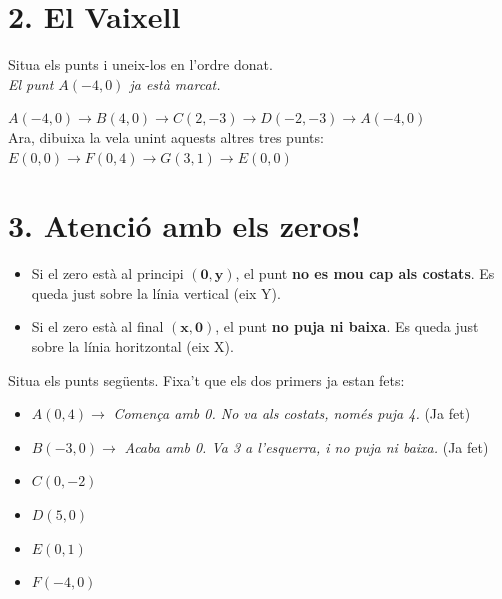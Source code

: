 \documentclass[12pt,a4paper]{article}
\begin{document}
\newpage
\section*{2. El Vaixell}
Situa els punts i uneix-los en l'ordre donat. \\
\textit{El punt $A(-4, 0)$ ja està marcat.}

$A(-4, 0) \to B(4, 0) \to C(2, -3) \to D(-2, -3) \to A(-4, 0)$ \\
Ara, dibuixa la vela unint aquests altres tres punts: $E(0, 0) \to F(0, 4) \to G(3, 1) \to E(0, 0)$

\begin{center}
\end{center}

\newpage
\section*{3. Atenció amb els zeros!}

\begin{tcolorbox}[colback=yellow!10, title=\textbf{Truc per quan hi ha un 0}]
    \begin{itemize}
        \item Si el zero està al principi $\mathbf{(0, y)}$, el punt \textbf{no es mou cap als costats}. Es queda just sobre la línia vertical (eix Y).
        \item Si el zero està al final $\mathbf{(x, 0)}$, el punt \textbf{no puja ni baixa}. Es queda just sobre la línia horitzontal (eix X).
    \end{itemize}
\end{tcolorbox}

Situa els punts següents. Fixa't que els dos primers ja estan fets:
\begin{itemize}
    \item $A(0, 4) \to$ \textit{Comença amb 0. No va als costats, només puja 4.} (Ja fet)
    \item $B(-3, 0) \to$ \textit{Acaba amb 0. Va 3 a l'esquerra, i no puja ni baixa.} (Ja fet)
    \item $C(0, -2)$ \quad \item $D(5, 0)$ \quad \item $E(0, 1)$ \quad \item $F(-4, 0)$
\end{itemize}
\end{document}
